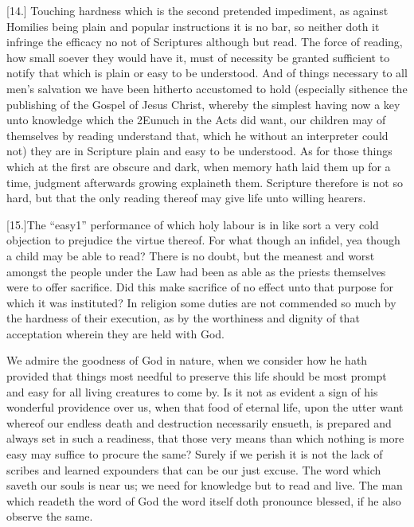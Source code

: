 [14.] Touching hardness which is the second pretended impediment, as against Homilies being plain and popular instructions it is no bar, so neither doth it infringe the efficacy no not of Scriptures although but read. The force of reading, how small soever they would have it, must of necessity be granted sufficient to notify that which is plain or easy to be understood. And of things necessary to all men’s salvation we have been hitherto accustomed to hold (especially sithence the publishing of the Gospel of Jesus Christ, whereby the simplest having now a key unto knowledge which the 2Eunuch in the Acts did want, our children may of themselves  by reading understand that, which he without an interpreter could not) they are in Scripture plain and easy to be understood.
 As for those things which at the first are obscure and dark, when memory hath laid them up for a time, judgment afterwards growing explaineth them. Scripture therefore is not so hard, but that the only reading thereof may give life unto willing hearers.

[15.]The “easy1” performance of which holy labour is in like sort a very cold objection to prejudice the virtue thereof. For what though an infidel, yea though a child may be able to read? There is no doubt, but the meanest and worst amongst the people under the Law had been as able as the priests themselves were to offer sacrifice. Did this make sacrifice of no effect unto that purpose for which it was instituted? In religion some duties are not commended so much by the hardness of their execution, as by the worthiness and dignity of that acceptation wherein they are held with God.

We admire the goodness of God in nature, when we consider how he hath provided that things most needful to preserve this life should be most prompt and easy for all living creatures to come by. Is it not as evident a sign of his wonderful providence over us, when that food of eternal life, upon the utter want whereof our endless death and destruction necessarily ensueth, is prepared and always set in such a readiness, that those very means than which nothing is more easy may suffice to procure the same? Surely if we perish it is not the lack of scribes and learned expounders that can be our just excuse. The word which saveth our souls is near us; we need for knowledge but to read and live. The man which readeth the word of God the word itself doth pronounce blessed, if he also observe the same.

